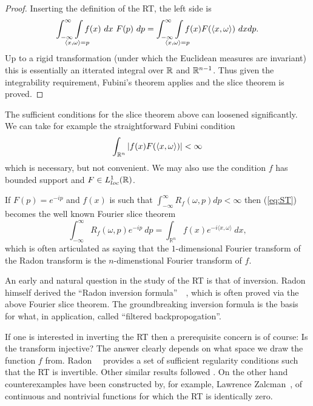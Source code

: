 \begin{proof}
  Inserting the definition of the RT, the left side is
  \[
    \int_{-\infty}^\infty \int\mclimits_{\langle x, \omega \rangle = p} f(x) ~dx~ F(p) ~dp 
    = \int_{-\infty}^\infty \int\mclimits_{\langle x, \omega \rangle = p} f(x) F(\langle x, \omega \rangle) ~dx dp.
  \]
  Up to a rigid transformation (under which the Euclidean measures are invariant) this is essentially an itterated integral over $\mathbb{R}$ and $\mathbb{R}^{n-1}$. Thus given the integrability requirement, Fubini's theorem applies and the slice theorem is proved.
\end{proof}

\begin{remark}
  The sufficient conditions for the slice theorem above can loosened significantly. We can take for example the straightforward Fubini condition 
  \[
      \int_{\mathbb{R}^n} |f(x)F(\langle x, \omega \rangle )| < \infty
  \]
  which is necessary, but not convenient. We may also use the condition $f$ has bounded support and $F \in L^1_{loc}(\mathbb{R})$.
\end{remark}

If $F(p) = e^{-ip}$ and $f(x)$ is such that $\int_{-\infty}^\infty R_f(\omega, p) dp < \infty$ then (\ref{eq:ST}) becomes the well known Fourier slice theorem
\[
  \int_{-\infty}^\infty R_f(\omega, p) e^{-ip} ~dp
  = \int_{\mathbb{R}^n} f(x) e^{-i\langle x, \omega\rangle} ~dx,
\]
which is often articulated as saying that the $1$-dimensional Fourier transform of the Radon transform is the $n$-dimenstional Fourier transform of $f$.

An early and natural question in the study of the RT is that of inversion. Radon himself derived the ``Radon inversion formula''~\cite{Rado17}~\cite{Rado86}, which is often proved via the above Fourier slice theorem. The groundbreaking inversion formula is the basis for what, in application, called ``filtered backpropogation''.

If one is interested in inverting the RT then a prerequisite concern is of course: Is the transform injective? The answer clearly depends on what space we draw the function $f$ from. Radon~\cite{Rado17}~\cite{Rado86} provides a set of sufficient regularity conditions such that the RT is invertible. Other similar results followed \cite{????}. On the other hand counterexamples have been constructed by, for example, Lawrence Zalcman~\cite{Zalc82}, of continuous and nontrivial functions for which the RT is identically zero.

